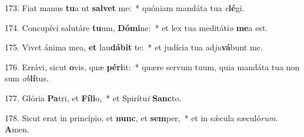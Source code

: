 173. Fiat manus \textbf{tu}a ut \textbf{sal}\textbf{vet} me:~*  quóniam mandáta tua \textit{e}\textbf{lé}gi.\

174. Concupívi salutáre \textbf{tu}um, \textbf{Dó}\textbf{mi}ne:~*  et lex tua meditáti\textit{o} \textbf{me}a est.\

175. Vivet ánima mea, \textbf{et} lau\textbf{dá}\textbf{bit} te:~*  et judícia tua ad\textit{ju}\textbf{vá}bunt me.\

176. Errávi, sicut \textbf{o}vis, quæ \textbf{pér}\textbf{i}it:~*  quære servum tuum, quia mandáta tua non sum \textit{ob}\textbf{lí}tus.\

177. Glória \textbf{Pa}tri, et \textbf{Fí}\textbf{li}o,~*  et Spirítu\textit{i} \textbf{Sanc}to.\

178. Sicut erat in princípio, et \textbf{nunc}, et \textbf{sem}per,~*  et in sǽcula sæculó\textit{rum}. \textbf{A}men.\

